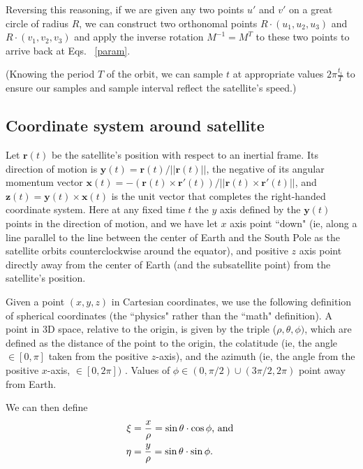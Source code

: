 \documentclass{article}
\begin{document}
Reversing this reasoning, if we are given any two points $u'$ and $v'$ on a great circle of radius $R$, we can construct two orthonomal points $R \cdot (u_1, u_2, u_3)$ and $R \cdot (v_1, v_2, v_3)$ and apply the inverse rotation $M^{-1} = M^T$ to these two points to arrive back at Eqs. ~\eqref{param}.

(Knowing the period $T$ of the orbit, we can sample $t$ at appropriate values $2\pi\frac{t_i}{T}$ to ensure our samples and sample interval reflect the satellite's speed.) 

\subsection{Coordinate system around satellite}

Let $\mathbf{r}(t)$ be the satellite's position with respect to an inertial frame. Its direction of motion is $\mathbf{y}(t) = \mathbf{r}(t)/||\mathbf{r}(t)||$, the negative of its angular momentum vector $\mathbf{x}(t) = -(\mathbf{r}(t) \times \mathbf{r}'(t))/||\mathbf{r}(t) \times \mathbf{r}'(t)||$, and $\mathbf{z}(t) = \mathbf{y}(t) \times \mathbf{x}(t)$ is the unit vector that completes the right-handed coordinate system. Here at any fixed time $t$ the $y$ axis defined by the $\mathbf{y}(t)$ points in the direction of motion, and we have let $x$ axis point ``down" (ie, along a line parallel to the line between the center of Earth and the South Pole as the satellite orbits counterclockwise around the equator), and positive $z$ axis point directly away from the center of Earth (and the subsatellite point) from the satellite's position.

Given a point $(x,y,z)$ in Cartesian coordinates, we use the following definition of spherical coordinates (the ``physics" rather than the ``math" definition). A point in 3D space, relative to the origin, is given by the triple ($\rho, \theta, \phi)$, which are defined as the distance of the point to the origin, the colatitude (ie, the angle $\in [0, \pi ]$ taken from the positive $z$-axis), and the azimuth (ie, the angle from the positive $x$-axis, $\in [0,2\pi])$ . Values of $\phi \in (0, \pi/2) \cup (3\pi/2, 2\pi)$ point away from Earth.

 We can then define
\begin{subequations}
\begin{align}
\xi &= \frac{x}{\rho} = \sin \theta \cdot \cos \phi \textnormal{, and } \label{xi1}\\ 
\eta &= \frac{y}{\rho} = \sin \theta \cdot \sin \phi \label{eta1}.
\end{align}
\end{subequations}
\end{document}
